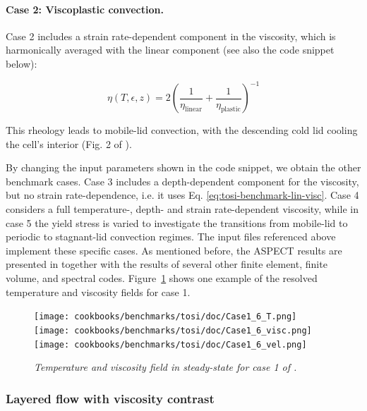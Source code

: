 \documentclass{article}
\newcommand{\aspect}{\textsc{ASPECT}}
\begin{document}
\paragraph{Case 2: Viscoplastic convection.}
\label{sec:benchmark-tosi-case-2}
Case 2 includes a strain rate-dependent component in the viscosity, which is harmonically averaged with the linear component (see also the code snippet below):

\begin{equation}
  \eta(T,\epsilon,z) = 2 \left(\frac{1}{\eta_\text{linear}}+\frac{1}{\eta_\text{plastic}}\right)^{-1}
  \label{eq:tosi-benchmark-ave-visc}
\end{equation}



This rheology leads to mobile-lid convection, with the descending cold lid cooling the cell's interior (Fig. 2 of \cite{T15}).

By changing the input parameters shown in the code snippet, we obtain the other benchmark cases.
Case 3 includes a depth-dependent component for the viscosity, but no strain rate-dependence, i.e. it uses Eq. \eqref{eq:tosi-benchmark-lin-visc}. Case 4 considers a full temperature-, depth- and strain rate-dependent viscosity, while in case 5 the yield stress is varied to investigate the transitions from mobile-lid to periodic to stagnant-lid convection regimes.
The input files referenced above implement these specific cases. As mentioned before, the \aspect{} results are presented in \cite{T15} together with the results of several other finite element, finite volume, and spectral codes. Figure~\ref{fig:tosi-benchmark-results} shows one example of the resolved temperature and viscosity fields for case 1.

\begin{figure}
  \begin{center}
    \texttt{[image: cookbooks/benchmarks/tosi/doc/Case1\_6\_T.png]}
    \texttt{[image: cookbooks/benchmarks/tosi/doc/Case1\_6\_visc.png]}
    \texttt{[image: cookbooks/benchmarks/tosi/doc/Case1\_6\_vel.png]}
  \end{center}
  \caption{\it Temperature and viscosity field in steady-state for case 1 of \cite{T15}.}
  \label{fig:tosi-benchmark-results}
\end{figure}

\subsubsection{Layered flow with viscosity contrast}
\label{sec:benchmark-layeredflow}
\end{document}
